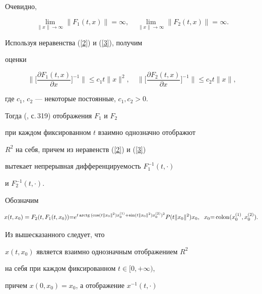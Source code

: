 Очевидно,


$$


\lim\limits_{\|x\|\rightarrow \infty}\|F_{1}(t,x)\|=\infty,


\quad


\lim\limits_{\|x\|\rightarrow \infty}\|F_{2}(t,x)\|=\infty.


$$


Используя неравенства (\ref{2}) и (\ref{3}), получим


оценки


$$


\bigg\|\bigg[\frac{\partial F_{1}(t,x)}{\partial x}\bigg]^{-1}


\bigg\|\leq c_{1}t\|x\|^{2},\quad


\bigg\|\bigg[\frac{\partial F_{2}(t,x)}{\partial x}\bigg]^{-1}


\bigg\|\leq c_{2}t\|x\|,


$$


где $c_{1}$, $c_{2}$ --- некоторые постоянные, $c_{1},c_{2}>0$.


Тогда (\cite{KrasnGe}, с.\,319) отображения $F_{1}$ и $F_{2}$


при каждом фиксированном $t$ взаимно однозначно отображют


$R^{2}$ на себя, причем из неравенств (\ref{2}) и (\ref{3})


вытекает непрерывная дифференцируемость $F_{1}^{-1}(t,\cdot )$


и $F_{2}^{-1}(t,\cdot )$.





Обозначим


\begin{equation}


\label{1310}


\negthickspace x(t,x_{0})=F_{2}(t,F_{1}(t,x_{0})){=}


e^{t\arctg{(\cos(t\|x_{0}\|^{2})x_{0}^{(1)}+


\sin(t\|x_{0}\|^{2})x_{0}^{(2)})^{2}}}P(t\|x_{0}\|^{2})x_{0},\ \;


x_{0}{=}\Colon(x_{0}^{(1)},x_{0}^{(2)}).


\end{equation}


Из вышесказанного следует, что


$x(t,x_{0})$ является взаимно однозначным отображением $R^{2}$


на себя при каждом фиксированном $t\in [0,+\infty)$,


причем $x(0,x_{0})=x_{0}$, а отображение $x^{-1}(t,\cdot)$


